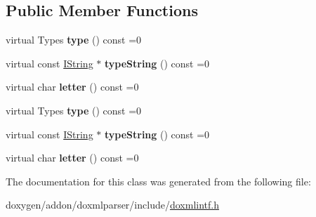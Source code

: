 \subsection*{Public Member Functions}
\begin{DoxyCompactItemize}
\item 
\mbox{\label{class_i_doc_symbol_a5b582d77aeb8e1f610447595db74d91e}} 
virtual Types {\bfseries type} () const =0
\item 
\mbox{\label{class_i_doc_symbol_a4158ec8ff3349d2aeb006026568e2a67}} 
virtual const \mbox{\hyperlink{class_i_string}{I\+String}} $\ast$ {\bfseries type\+String} () const =0
\item 
\mbox{\label{class_i_doc_symbol_a4797ce5fc002ed02e7056f7d32a96289}} 
virtual char {\bfseries letter} () const =0
\item 
\mbox{\label{class_i_doc_symbol_a5b582d77aeb8e1f610447595db74d91e}} 
virtual Types {\bfseries type} () const =0
\item 
\mbox{\label{class_i_doc_symbol_a4158ec8ff3349d2aeb006026568e2a67}} 
virtual const \mbox{\hyperlink{class_i_string}{I\+String}} $\ast$ {\bfseries type\+String} () const =0
\item 
\mbox{\label{class_i_doc_symbol_a4797ce5fc002ed02e7056f7d32a96289}} 
virtual char {\bfseries letter} () const =0
\end{DoxyCompactItemize}


The documentation for this class was generated from the following file\+:\begin{DoxyCompactItemize}
\item 
doxygen/addon/doxmlparser/include/\mbox{\hyperlink{include_2doxmlintf_8h}{doxmlintf.\+h}}\end{DoxyCompactItemize}
